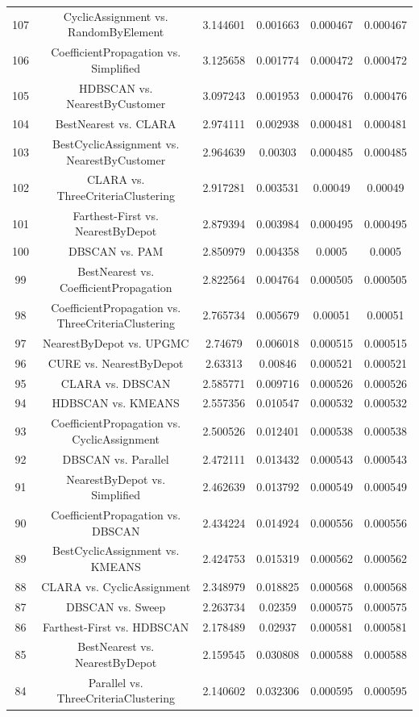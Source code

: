 \documentclass[a4paper,10pt]{article}
\begin{document}
\begin{landscape}
\begin{table}[!htp]
\begin{tabular}{cccccc}
107&CyclicAssignment vs. RandomByElement&3.144601&0.001663&0.000467&0.000467\\
106&CoefficientPropagation vs. Simplified&3.125658&0.001774&0.000472&0.000472\\
105&HDBSCAN vs. NearestByCustomer&3.097243&0.001953&0.000476&0.000476\\
104&BestNearest vs. CLARA&2.974111&0.002938&0.000481&0.000481\\
103&BestCyclicAssignment vs. NearestByCustomer&2.964639&0.00303&0.000485&0.000485\\
102&CLARA vs. ThreeCriteriaClustering&2.917281&0.003531&0.00049&0.00049\\
101&Farthest-First vs. NearestByDepot&2.879394&0.003984&0.000495&0.000495\\
100&DBSCAN vs. PAM&2.850979&0.004358&0.0005&0.0005\\
99&BestNearest vs. CoefficientPropagation&2.822564&0.004764&0.000505&0.000505\\
98&CoefficientPropagation vs. ThreeCriteriaClustering&2.765734&0.005679&0.00051&0.00051\\
97&NearestByDepot vs. UPGMC&2.74679&0.006018&0.000515&0.000515\\
96&CURE vs. NearestByDepot&2.63313&0.00846&0.000521&0.000521\\
95&CLARA vs. DBSCAN&2.585771&0.009716&0.000526&0.000526\\
94&HDBSCAN vs. KMEANS&2.557356&0.010547&0.000532&0.000532\\
93&CoefficientPropagation vs. CyclicAssignment&2.500526&0.012401&0.000538&0.000538\\
92&DBSCAN vs. Parallel&2.472111&0.013432&0.000543&0.000543\\
91&NearestByDepot vs. Simplified&2.462639&0.013792&0.000549&0.000549\\
90&CoefficientPropagation vs. DBSCAN&2.434224&0.014924&0.000556&0.000556\\
89&BestCyclicAssignment vs. KMEANS&2.424753&0.015319&0.000562&0.000562\\
88&CLARA vs. CyclicAssignment&2.348979&0.018825&0.000568&0.000568\\
87&DBSCAN vs. Sweep&2.263734&0.02359&0.000575&0.000575\\
86&Farthest-First vs. HDBSCAN&2.178489&0.02937&0.000581&0.000581\\
85&BestNearest vs. NearestByDepot&2.159545&0.030808&0.000588&0.000588\\
84&Parallel vs. ThreeCriteriaClustering&2.140602&0.032306&0.000595&0.000595\\

\end{tabular}
\end{table}
\end{landscape}
\end{document}
